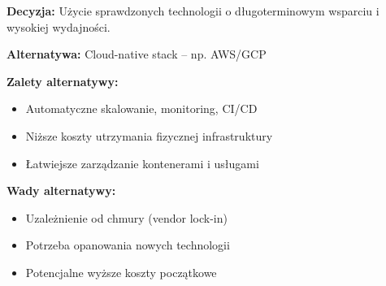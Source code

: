 \textbf{Decyzja:} Użycie sprawdzonych technologii o długoterminowym wsparciu i wysokiej wydajności.

\textbf{Alternatywa:} Cloud-native stack – np. AWS/GCP

\textbf{Zalety alternatywy:}
\begin{itemize}
\item Automatyczne skalowanie, monitoring, CI/CD
\item Niższe koszty utrzymania fizycznej infrastruktury
\item Łatwiejsze zarządzanie kontenerami i usługami
\end{itemize}

\textbf{Wady alternatywy:}
\begin{itemize}
\item Uzależnienie od chmury (vendor lock-in)
\item Potrzeba opanowania nowych technologii
\item Potencjalne wyższe koszty początkowe
\end{itemize}

